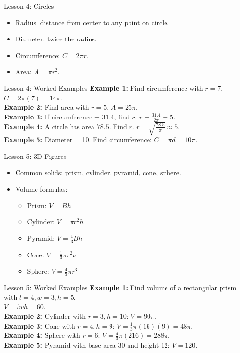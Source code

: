 \documentclass{beamer}
\begin{document}
\begin{frame}{Lesson 4: Circles}
\begin{itemize}
  \item Radius: distance from center to any point on circle.
  \item Diameter: twice the radius.
  \item Circumference: $C = 2\pi r$.
  \item Area: $A = \pi r^2$.
\end{itemize}
\end{frame}

\begin{frame}{Lesson 4: Worked Examples}
\textbf{Example 1:} Find circumference with $r=7$. $C = 2\pi(7) = 14\pi$.\\[1em]
\textbf{Example 2:} Find area with $r=5$. $A = 25\pi$.\\[1em]
\textbf{Example 3:} If circumference = $31.4$, find $r$. $r = \tfrac{31.4}{2\pi} = 5$.\\[1em]
\textbf{Example 4:} A circle has area $78.5$. Find $r$. $r = \sqrt{\tfrac{78.5}{\pi}} \approx 5$.\\[1em]
\textbf{Example 5:} Diameter = 10. Find circumference: $C = \pi d = 10\pi$.
\end{frame}

\begin{frame}{Lesson 5: 3D Figures}
\begin{itemize}
  \item Common solids: prism, cylinder, pyramid, cone, sphere.
  \item Volume formulas:
  \begin{itemize}
    \item Prism: $V = Bh$
    \item Cylinder: $V = \pi r^2h$
    \item Pyramid: $V = \tfrac{1}{3}Bh$
    \item Cone: $V = \tfrac{1}{3}\pi r^2h$
    \item Sphere: $V = \tfrac{4}{3}\pi r^3$
  \end{itemize}
\end{itemize}
\end{frame}

\begin{frame}{Lesson 5: Worked Examples}
\textbf{Example 1:} Find volume of a rectangular prism with $l=4, w=3, h=5$.\\
$V = lwh = 60$.\\[1em]
\textbf{Example 2:} Cylinder with $r=3, h=10$: $V = 90\pi$.\\[1em]
\textbf{Example 3:} Cone with $r=4, h=9$: $V = \tfrac{1}{3}\pi(16)(9) = 48\pi$.\\[1em]
\textbf{Example 4:} Sphere with $r=6$: $V = \tfrac{4}{3}\pi(216) = 288\pi$.\\[1em]
\textbf{Example 5:} Pyramid with base area 30 and height 12: $V = 120$.
\end{frame}
\end{document}
